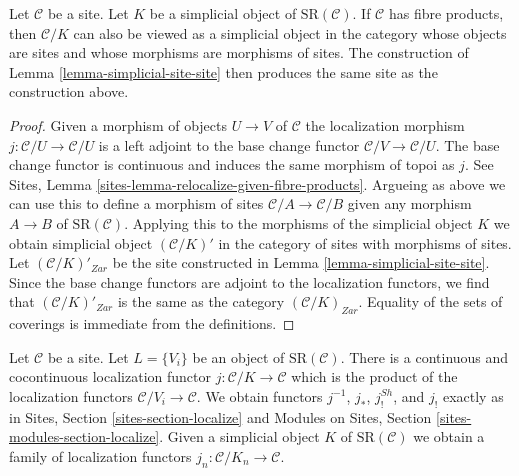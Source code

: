 \begin{lemma}
\label{lemma-sr-when-fibre-products}
Let $\mathcal{C}$ be a site. Let $K$ be a simplicial object of
$\text{SR}(\mathcal{C})$. If $\mathcal{C}$ has fibre products,
then $\mathcal{C}/K$ can also be viewed as a simplicial object
in the category whose objects are sites and whose morphisms are
morphisms of sites. The construction of
Lemma \ref{lemma-simplicial-site-site}
then produces the same site as the construction above.
\end{lemma}

\begin{proof}
Given a morphism of objects $U \to V$ of $\mathcal{C}$ the localization
morphism $j : \mathcal{C}/U \to \mathcal{C}/U$ is a left adjoint to
the base change functor $\mathcal{C}/V \to \mathcal{C}/U$.
The base change functor is continuous and induces the same morphism of
topoi as $j$. See
Sites, Lemma \ref{sites-lemma-relocalize-given-fibre-products}.
Argueing as above we can use this to define a morphism of sites
$\mathcal{C}/A \to \mathcal{C}/B$ given any morphism $A \to B$
of $\text{SR}(\mathcal{C})$. Applying this to the morphisms of
the simplicial object $K$ we obtain simplicial object
$(\mathcal{C}/K)'$ in the category of sites with morphisms of sites.
Let $(\mathcal{C}/K)'_{Zar}$ be the site constructed in
Lemma \ref{lemma-simplicial-site-site}.
Since the base change functors are adjoint to the localization
functors, we find that $(\mathcal{C}/K)'_{Zar}$ is the same
as the category $(\mathcal{C}/K)_{Zar}$. Equality of the
sets of coverings is immediate from the definitions.
\end{proof}

\noindent
Let $\mathcal{C}$ be a site. Let $L = \{V_i\}$ be an object of
$\text{SR}(\mathcal{C})$. There is a continuous and cocontinuous
localization functor $j : \mathcal{C}/K \to \mathcal{C}$ which is
the product of the localization functors $\mathcal{C}/V_i \to \mathcal{C}$.
We obtain functors $j^{-1}$, $j_*$, $j^{Sh}_!$, and $j_!$ exactly
as in Sites, Section \ref{sites-section-localize} and
Modules on Sites, Section \ref{sites-modules-section-localize}.
Given a simplicial
object $K$ of $\text{SR}(\mathcal{C})$ we obtain a family
of localization functors $j_n : \mathcal{C}/K_n \to \mathcal{C}$.

